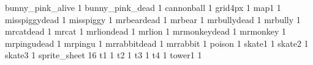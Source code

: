 bunny_pink_alive 1
bunny_pink_dead 1
cannonball 1
grid4px 1
map1 1
misspiggydead 1
misspiggy 1
mrbeardead 1
mrbear 1
mrbullydead 1
mrbully 1
mrcatdead 1
mrcat 1
mrliondead 1
mrlion 1
mrmonkeydead 1
mrmonkey 1
mrpingudead 1
mrpingu 1
mrrabbitdead 1
mrrabbit 1
poison 1
skate1 1
skate2 1
skate3 1
sprite_sheet 16
t1 1
t2 1
t3 1
t4 1
tower1 1

